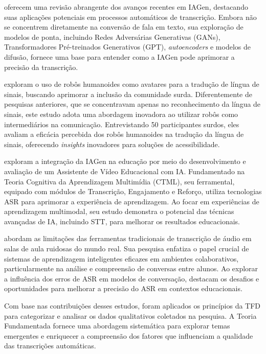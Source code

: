  oferecem uma revisão abrangente dos avanços recentes em IAGen, destacando suas aplicações potenciais em processos automáticos de transcrição. Embora não se concentrem diretamente na conversão de fala em texto, sua exploração de modelos de ponta, incluindo Redes Adversárias Generativas (GANs), Transformadores Pré-treinados Generativos (GPT), \textit{autoencoders} e modelos de difusão, fornece uma base para entender como a IAGen pode aprimorar a precisão da transcrição.

 exploram o uso de robôs humanoides como avatares para a tradução de língua de sinais, buscando aprimorar a inclusão da comunidade surda. Diferentemente de pesquisas anteriores, que se concentravam apenas no reconhecimento da língua de sinais, este estudo adota uma abordagem inovadora ao utilizar robôs como intermediários na comunicação. Entrevistando 50 participantes surdos, eles avaliam a eficácia percebida dos robôs humanoides na tradução da língua de sinais, oferecendo \textit{insights} inovadores para soluções de acessibilidade.

 exploram a integração da IAGen na educação por meio do desenvolvimento e avaliação de um Assistente de Vídeo Educacional com IA. Fundamentado na Teoria Cognitiva da Aprendizagem Multimídia (CTML), seu ferramental, equipado com módulos de Transcrição, Engajamento e Reforço, utiliza tecnologias ASR para aprimorar a experiência de aprendizagem. Ao focar em experiências de aprendizagem multimodal, seu estudo demonstra o potencial das técnicas avançadas de IA, incluindo STT, para melhorar os resultados educacionais.

 abordam as limitações das ferramentas tradicionais de transcrição de áudio em salas de aula ruidosas do mundo real. Sua pesquisa enfatiza o papel crucial de sistemas de aprendizagem inteligentes eficazes em ambientes colaborativos, particularmente na análise e compreensão de conversas entre alunos. Ao explorar a influência dos erros de ASR em modelos de conversação, destacam os desafios e oportunidades para melhorar a precisão do ASR em contextos educacionais.

Com base nas contribuições desses estudos, foram aplicados os princípios da TFD \cite{Charmaz2009} para categorizar e analisar os dados qualitativos coletados na pesquisa. A Teoria Fundamentada fornece uma abordagem sistemática para explorar temas emergentes e enriquecer a compreensão dos fatores que influenciam a qualidade das transcrições automáticas.

